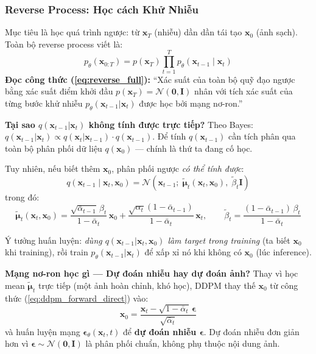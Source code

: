 \subsubsection{Reverse Process: Học cách Khử Nhiễu}
\label{subsubsec:reverse_process}

Mục tiêu là học quá trình ngược: từ $\mathbf{x}_T$ (nhiễu) dần dần tái tạo $\mathbf{x}_0$ (ảnh sạch). Toàn bộ reverse process viết là:
\begin{equation}
    p_\theta(\mathbf{x}_{0:T}) = p(\mathbf{x}_T) \prod_{t=1}^T p_\theta(\mathbf{x}_{t-1} \mid \mathbf{x}_t)
    \label{eq:reverse_full}
\end{equation}
\textbf{Đọc công thức (\ref{eq:reverse_full}):} ``Xác suất của toàn bộ quỹ đạo ngược bằng xác suất điểm khởi đầu $p(\mathbf{x}_T) = \mathcal{N}(\mathbf{0},\mathbf{I})$ nhân với tích xác suất của từng bước khử nhiễu $p_\theta(\mathbf{x}_{t-1}|\mathbf{x}_t)$ được học bởi mạng nơ-ron.''

\textbf{Tại sao $q(\mathbf{x}_{t-1}|\mathbf{x}_t)$ không tính được trực tiếp?}
Theo Bayes: $q(\mathbf{x}_{t-1}|\mathbf{x}_t) \propto q(\mathbf{x}_t|\mathbf{x}_{t-1}) \cdot q(\mathbf{x}_{t-1})$. Để tính $q(\mathbf{x}_{t-1})$ cần tích phân qua toàn bộ phân phối dữ liệu $q(\mathbf{x}_0)$ --- chính là thứ ta đang cố học.

Tuy nhiên, nếu biết thêm $\mathbf{x}_0$, phân phối ngược \textit{có thể tính được}:
\begin{equation}
    q(\mathbf{x}_{t-1} \mid \mathbf{x}_t, \mathbf{x}_0) = \mathcal{N}\!\left(\mathbf{x}_{t-1};\; \tilde{\boldsymbol{\mu}}_t(\mathbf{x}_t, \mathbf{x}_0),\; \tilde{\beta}_t \mathbf{I}\right)
    \label{eq:reverse_posterior}
\end{equation}
trong đó:
\[
    \tilde{\boldsymbol{\mu}}_t(\mathbf{x}_t, \mathbf{x}_0) = \frac{\sqrt{\bar{\alpha}_{t-1}}\,\beta_t}{1-\bar{\alpha}_t}\,\mathbf{x}_0 + \frac{\sqrt{\alpha_t}(1-\bar{\alpha}_{t-1})}{1-\bar{\alpha}_t}\,\mathbf{x}_t, \qquad \tilde{\beta}_t = \frac{(1-\bar{\alpha}_{t-1})\,\beta_t}{1-\bar{\alpha}_t}
\]

Ý tưởng huấn luyện: \textit{dùng $q(\mathbf{x}_{t-1}|\mathbf{x}_t,\mathbf{x}_0)$ làm target trong training} (ta biết $\mathbf{x}_0$ khi training), rồi train $p_\theta(\mathbf{x}_{t-1}|\mathbf{x}_t)$ để xấp xỉ nó khi không có $\mathbf{x}_0$ (lúc inference).

\textbf{Mạng nơ-ron học gì --- Dự đoán nhiễu hay dự đoán ảnh?}
Thay vì học mean $\tilde{\boldsymbol{\mu}}_t$ trực tiếp (một ảnh hoàn chỉnh, khó học), DDPM thay thế $\mathbf{x}_0$ từ công thức (\ref{eq:ddpm_forward_direct}) vào:
\[
    \mathbf{x}_0 = \frac{\mathbf{x}_t - \sqrt{1-\bar{\alpha}_t}\,\boldsymbol{\epsilon}}{\sqrt{\bar{\alpha}_t}}
\]
và huấn luyện mạng $\boldsymbol{\epsilon}_\theta(\mathbf{x}_t, t)$ để \textbf{dự đoán nhiễu $\boldsymbol{\epsilon}$}. Dự đoán nhiễu đơn giản hơn vì $\boldsymbol{\epsilon} \sim \mathcal{N}(\mathbf{0},\mathbf{I})$ là phân phối chuẩn, không phụ thuộc nội dung ảnh.


